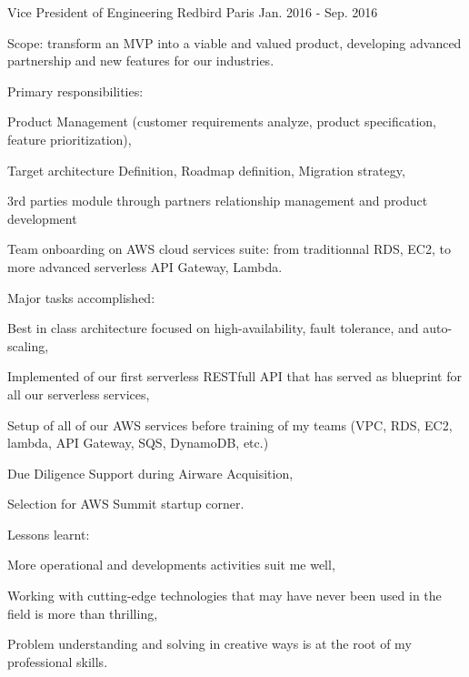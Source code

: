 \begin{cventries}
  \cventry
    {Vice President of Engineering} %
    {Redbird} %
    {Paris} %
    {Jan. 2016 - Sep. 2016} %
    {
      \begin{cvitems} %
        \item {Scope: transform an MVP into a viable and valued product, developing advanced partnership and new features for our industries.}
        \item {Primary responsibilities:} %
        \begin{cvsubitems}
          \item {Product Management (customer requirements analyze, product specification, feature prioritization),}
          \item {Target architecture Definition, Roadmap definition, Migration strategy,}
          \item {3rd parties module through partners relationship management and product development}
          \item {Team onboarding on AWS cloud services suite: from traditionnal RDS, EC2, to more advanced serverless API Gateway, Lambda.}
        \end{cvsubitems}
        \item {Major tasks accomplished:}
        \begin{cvsubitems}
          \item {Best in class architecture focused on high-availability, fault tolerance, and auto-scaling,}
          \item {Implemented of our first serverless RESTfull API that has served as blueprint for all our serverless services,}
          \item {Setup of all of our AWS services before training of my teams (VPC, RDS, EC2, lambda, API Gateway, SQS, DynamoDB, etc.)}
          \item {Due Diligence Support during Airware Acquisition,}
          \item {Selection for AWS Summit startup corner.}
        \end{cvsubitems}
        \item {Lessons learnt:}
        \begin{cvsubitems}
          \item {More operational and developments activities suit me well,}
          \item {Working with cutting-edge technologies that may have never been used in the field is more than thrilling,}
          \item {Problem understanding and solving in creative ways is at the root of my professional skills.}
        \end{cvsubitems}
      \end{cvitems}
    }


\end{cventries}
